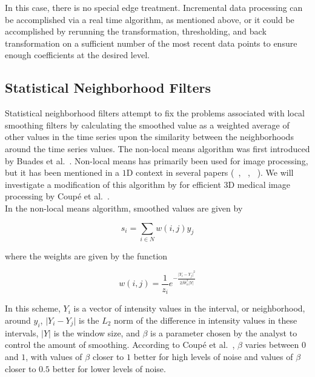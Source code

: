 \documentclass[11pt]{article}
\theoremstyle{definition}
\begin{document}
In this case, there is no special edge treatment. Incremental data processing can be accomplished via a real time algorithm, as mentioned above, or it could be accomplished by rerunning the transformation, thresholding, and back transformation on a sufficient number of the most recent data points to ensure enough coefficients at the desired level.

\newpage

\subsection{Statistical Neighborhood Filters}

Statistical neighborhood filters attempt to fix the problems associated with local smoothing filters by calculating the smoothed value as a weighted average of other values in the time series upon the similarity between the neighborhoods around the time series values. The non-local means algorithm was first introduced by Buades et al.~\cite{Buades05}. Non-local means has primarily been used for image processing, but it has been mentioned in a $1$D context in several papers (~\cite{Galiano13}, ~\cite{Tracey12}, ~\cite{Zoican10}).  We will investigate a modification of this algorithm by for efficient $3$D medical image processing by Coup{\'e} et al.~\cite{Coupe07}.\\

In the non-local means algorithm, smoothed values are given by

\begin{displaymath}
s_i = \sum _{i \in N} w \left(i, j \right) y_j
\end{displaymath}

\noindent
where the weights are given by the function

\begin{displaymath}
w \left(i, j \right) = \frac{1}{z_i} e^{-\frac{\lvert Y_i - Y_j \rvert ^2}{2 \beta \hat{\sigma}^2_n \lvert Y \rvert}}
\end{displaymath}

In this scheme, $Y_i$ is a vector of intensity values in the interval, or neighborhood, around $y_i$, $\lvert Y_i - Y_j \rvert$ is the $L_2$ norm of the difference in intensity values in these intervals, $\lvert Y \rvert$ is the window size, and $\beta$ is a parameter chosen by the analyst to control the amount of smoothing. According to Coup{\'e} et al.~\cite{Coupe07}, $\beta$ varies between $0$ and $1$, with values of $\beta$ closer to $1$ better for high levels of noise and values of $\beta$ closer to $0.5$ better for lower levels of noise.\\
\end{document}
